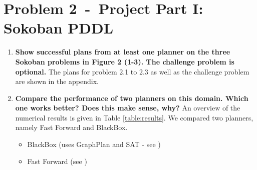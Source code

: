 \documentclass[12pt]{article}
\newcommand{\problem}[2]{\section*{Problem {#1}~-~{#2}}}
\begin{document}
\problem{2}{Project Part I: Sokoban PDDL}
\label{sec:problem_2}
\begin{enumerate}
 \item \textbf{Show successful plans from at least one planner on the three Sokoban problems in Figure 2
(1-3). The challenge problem is optional.}
  The plans for problem 2.1 to 2.3 as well as the challenge problem are shown in the appendix.
 \item \textbf{Compare the performance of two planners on this domain. Which one works better? Does this
make sense, why?} \newline
    An overview of the numerical results is given in Table \ref{table:results}. We compared two planners, namely Fast Forward and BlackBox. 

        \begin{itemize}
     \item BlackBox (uses GraphPlan and SAT - see \cite{Blackbox})
     
     \item Fast Forward (see \cite{FastForward})
     

\end{itemize}
\end{enumerate}
\end{document}
